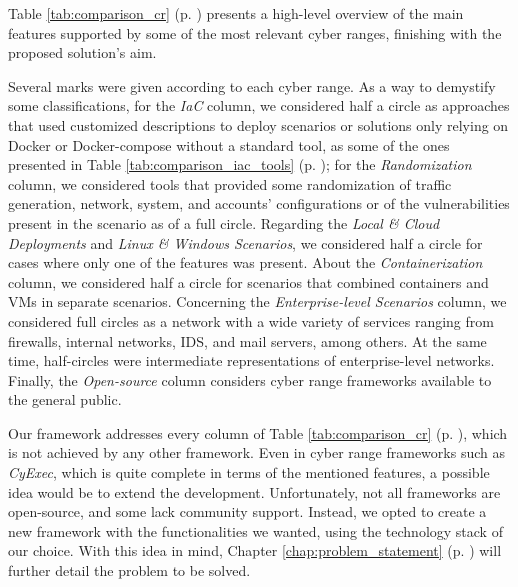 Table \ref{tab:comparison_cr} (p. \pageref{tab:comparison_cr}) presents a high-level overview of the main features supported by some of the most relevant cyber ranges, finishing with the proposed solution's aim.

Several marks were given according to each cyber range. As a way to demystify some classifications, for the \textit{IaC} column, we considered half a circle as approaches that used customized descriptions to deploy scenarios or solutions only relying on Docker or Docker-compose without a standard tool, as some of the ones presented in Table \ref{tab:comparison_iac_tools} (p. \pageref{tab:comparison_iac_tools}); for the \textit{Randomization} column, we considered tools that provided some randomization of traffic generation, network, system, and accounts' configurations or of the vulnerabilities present in the scenario as of a full circle. Regarding the \textit{Local \& Cloud Deployments} and \textit{Linux \& Windows Scenarios}, we considered half a circle for cases where only one of the features was present. About the \textit{Containerization} column, we considered half a circle for scenarios that combined containers and VMs in separate scenarios. Concerning the \textit{Enterprise-level Scenarios} column, we considered full circles as a network with a wide variety of services ranging from firewalls, internal networks, IDS, and mail servers, among others. At the same time, half-circles were intermediate representations of enterprise-level networks. Finally, the \textit{Open-source} column considers cyber range frameworks available to the general public.

Our framework addresses every column of Table \ref{tab:comparison_cr} (p. \pageref{tab:comparison_cr}), which is not achieved by any other framework. Even in cyber range frameworks such as \textit{CyExec}, which is quite complete in terms of the mentioned features, a possible idea would be to extend the development. Unfortunately, not all frameworks are open-source, and some lack community support. Instead, we opted to create a new framework with the functionalities we wanted, using the technology stack of our choice. With this idea in mind, Chapter \ref{chap:problem_statement} (p. \pageref{chap:problem_statement}) will further detail the problem to be solved.
